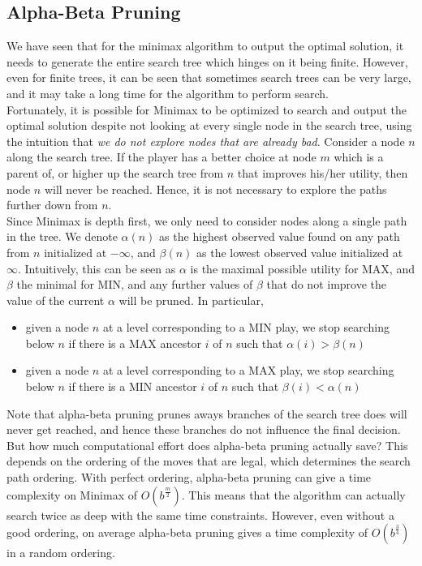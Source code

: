 \documentclass[12pt]{article}
\begin{document}
\subsection{Alpha-Beta Pruning}

We have seen that for the minimax algorithm to output the optimal solution, it needs to generate the entire search tree which hinges on it being finite. However, even for finite trees, it can be seen that sometimes search trees can be very large, and it may take a long time for the algorithm to perform search.\\

Fortunately, it is possible for Minimax to be optimized to search and output the optimal solution despite not looking at every single node in the search tree, using the intuition that \textit{we do not explore nodes that are already bad}. Consider a node $n$ along the search tree. If the player has a better choice at node $m$ which is a parent of, or higher up the search tree from $n$ that improves his/her utility, then node $n$ will never be reached. Hence, it is not necessary to explore the paths further down from $n$.\\

Since Minimax is depth first, we only need to consider nodes along a single path in the tree. We denote $\alpha(n)$ as the highest observed value found on any path from $n$ initialized at $- \infty$, and $\beta(n)$ as the lowest observed value initialized at $\infty$. Intuitively, this can be seen as $\alpha$ is the maximal possible utility for MAX, and $\beta$ the minimal for MIN, and any further values of $\beta$ that do not improve the value of the current $\alpha$ will be pruned. In particular,

\begin{itemize}
\item given a node $n$ at a level corresponding to a MIN play, we stop searching below $n$ if there is a MAX ancestor $i$ of $n$ such that $\alpha(i) > \beta(n)$
\item given a node $n$ at a level corresponding to a MAX play, we stop searching below $n$ if there is a MIN ancestor $i$ of $n$ such that $\beta(i) < \alpha(n)$
\end{itemize} 

Note that alpha-beta pruning prunes aways branches of the search tree does will never get reached, and hence these branches do not influence the final decision. But how much computational effort does alpha-beta pruning actually save? This depends on the ordering of the moves that are legal, which determines the search path ordering. With perfect ordering, alpha-beta pruning can give a time complexity on Minimax of $O(b^\frac{m}{2})$. This means that the algorithm can actually search twice as deep with the same time constraints. However, even without a good ordering, on average alpha-beta pruning gives a time complexity of $O(b^\frac{3}{4})$ in a random ordering.
\end{document}
